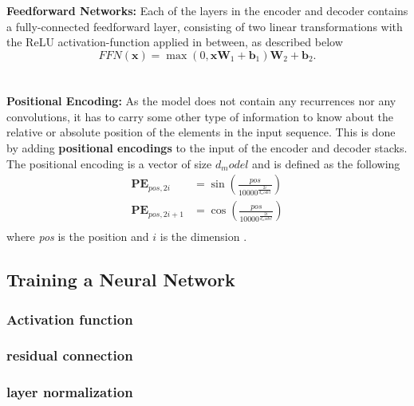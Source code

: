 \documentclass[./main.tex]{subfiles}
\begin{document}
\\
\\
\noindent \textbf{Feedforward Networks:} Each of the layers in the encoder and decoder contains a fully-connected feedforward layer, consisting of two linear transformations with the ReLU activation-function applied in between, as described below \cite{https://doi.org/10.48550/arxiv.1706.03762}
\begin{equation}
    FFN(\bm{x}) = \max \left(0, \bm{x} \bm{W}_1 + \bm{b}_1 \right) \bm{W}_2 + \bm{b}_2.
\end{equation}
\\
\\
\noindent \textbf{Positional Encoding:} As the model does not contain any recurrences nor any convolutions, it has to carry some other type of information to know about the relative or absolute position of the elements in the input sequence. This is done by adding \textbf{positional encodings} to the input of the encoder and decoder stacks. The positional encoding is a vector of size $d_model$ and is defined as the following
\begin{align}
    \bm{PE}_{pos, 2i} &= \sin \left( \frac{pos}{10000^{\frac{2i}{d_model}}} \right) \\
    \bm{PE}_{pos, 2i + 1} &= \cos \left( \frac{pos}{10000^{\frac{2i}{d_model}}} \right) \\
\end{align}
where \textit{pos} is the position and $i$ is the dimension \cite{https://doi.org/10.48550/arxiv.1706.03762}.

\subsection{Training a Neural Network}
\subsubsection{Activation function}
\subsubsection{residual connection}
\subsubsection{layer normalization}
\label{subsubsec:activation_func}
\end{document}
